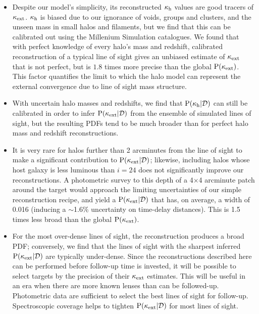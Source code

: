 \documentclass[useAMS,usenatbib,a4paper]{mn2e}
\begin{document}
\begin{itemize} 

\item Despite our model's simplicity, its reconstructed $\kappa_{\rm h}$ values are
good tracers of $\kappa_{\rm ext}$. $\kappa_{\rm h}$ is biased due to our ignorance of voids,
groups and clusters, and the unseen mass in small halos and filaments, but we
find that this can be calibrated out using the Millenium Simulation
catalogues. We found that with perfect knowledge of every halo's mass and
redshift,  calibrated reconstruction of a typical line of sight  gives an
unbiased estimate of $\kappa_{\rm ext}$ that is not perfect, but is $1.8$ 
times more precise than the global
${\rm P}(\kappa_{\rm ext})$. This factor quantifies the limit to which the halo model can
represent the external convergence due to line of sight mass structure.

\item With uncertain halo masses and redshifts, we find that
${\rm P}(\kappa_{\rm h}|{\mathcal{D}})$ can still be calibrated in order to infer
${\rm P}(\kappa_{\rm ext}|{\mathcal{D}})$ from the ensemble of simulated lines of sight, but the
resulting PDFs tend to be much broader than for perfect halo mass and redshift
reconstructions.

\item It is very rare for halos further than 2 arcminutes from the line of
sight to make a significant contribution to ${\rm P}(\kappa_{\rm ext}|{\mathcal{D}})$; likewise, 
including
halos whose host galaxy is less luminous than $i=24$ does not significantly
improve our reconstructions.  A photometric survey to this depth of a
4$\times$4 arcminute patch around the target would approach the limiting
uncertainties of our simple reconstruction recipe, and yield a 
${\rm P}(\kappa_{\rm ext}|{\mathcal{D}})$ that has, on average, a width of 0.016 (inducing a $\sim$1.6\%
uncertainty on time-delay distances). This is 1.5 times
less broad than the global ${\rm P}(\kappa_{\rm ext})$. 

\item  For the most over-dense lines of sight, the reconstruction produces a
broad PDF; conversely, we find that the lines of sight with the sharpest
inferred ${\rm P}(\kappa_{\rm ext}|{\mathcal{D}})$ are typically under-dense. Since the
reconstructions described here can be performed before follow-up time is
invested, it will be possible to select targets by the precision of their
$\kappa_{\rm ext}$ estimates. This will be useful in an era when there are more known
lenses than can be followed-up. Photometric data are sufficient to select the best lines of sight for
follow-up. Spectroscopic coverage helps to tighten  ${\rm P}(\kappa_{\rm ext}|{\mathcal{D}})$ for
most lines of sight.


\end{itemize}
\end{document}
